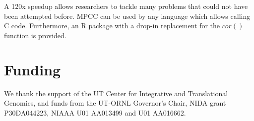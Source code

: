 \documentclass{bioinfo}
\begin{document}
A 120x speedup allows researchers to tackle many problems that could
not have been attempted before. MPCC can be used by any language which
allows calling C code. Furthermore, an R package with a drop-in
replacement for the $cor()$ function is provided.
\vspace*{-5mm}
\section*{Funding}
We thank the support of the UT Center for Integrative and Translational Genomics,
and funds from the UT-ORNL Governor's Chair, NIDA grant P30DA044223, NIAAA U01
AA013499 and U01 AA016662.
\vspace*{-5mm}


\end{document}
